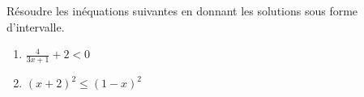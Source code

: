 
\begin{exercice}\label{exosmath-0342}

    Résoudre les inéquations suivantes en donnant les solutions sous forme d'intervalle.
    \begin{enumerate}
        \item
            \( \frac{ 4 }{ 3x+1 }+2<0\)
        \item
            \( (x+2)^2\leq (1-x)^2\)
    \end{enumerate}


\end{exercice}
